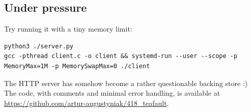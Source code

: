 \documentclass[twocolumn,9pt]{extarticle}
\begin{document}
\vspace{-9pt}
\subsection*{Under pressure}
\vspace{-6pt}
Try running it with a tiny memory limit:
\begin{lstlisting}
python3 ./server.py
gcc -pthread client.c -o client && systemd-run --user --scope -p MemoryMax=1M -p MemorySwapMax=0 ./client
\end{lstlisting}
The HTTP server has somehow become a rather questionable backing store :)
The code, with comments and minimal error handling, is available at \url{https://github.com/artur-augustyniak/418_teafault}.
\end{document}
